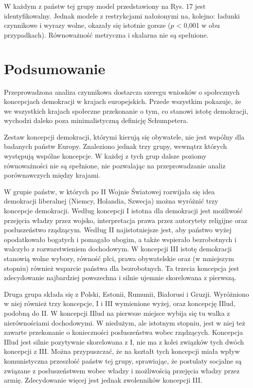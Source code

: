 \documentclass[12pt]{article}
\begin{document}
W każdym z państw tej grupy model przedstawiony na Rys. 17 jest identyfikowalny. Jednak modele z restrykcjami nałożonymi na, kolejno: ładunki czynnikowe i wyrazy wolne, okazały się istotnie gorsze (\(p\) \textless{} 0,001 w obu przypadkach). Równoważność metryczna i skalarna nie są spełnione.

\hypertarget{podsumowanie}{%
\section{Podsumowanie}\label{podsumowanie}}

Przeprowadzona analiza czynnikowa dostarcza szeregu wniosków o społecznych koncepcjach demokracji w krajach europejskich. Przede wszystkim pokazuje, że we wszystkich krajach społeczne przekonanie o tym, co stanowi istotę demokracji, wychodzi daleko poza minimalistyczną definicję Schumpetera.

Zestaw koncepcji demokracji, którymi kierują się obywatele, nie jest wspólny dla badanych państw Europy. Znaleziono jednak trzy grupy, wewnątrz których występują wspólne koncepcje. W każdej z tych grup dalsze poziomy równoważności nie są spełnione, nie pozwalając na przeprowadzanie analiz porównawczych między krajami.

W grupie państw, w których po II Wojnie Światowej rozwijała się idea demokracji liberalnej (Niemcy, Holandia, Szwecja) można wyróżnić trzy koncepcje demokracji. Według koncepcji I istotna dla demokracji jest możliwość przejęcia władzy przez wojsko, interpretacja prawa przez autorytety religijne oraz posłuszeństwo rządzącym. Według II najistotniejsze jest, aby państwo wyżej opodatkowało bogatych i pomagało ubogim, a także wspierało bezrobotnych i walczyło z rozwarstwieniem dochodowym. W koncepcji III istotę demokracji stanowią wolne wybory, równość płci, prawa obywatelskie oraz (w mniejszym stopniu) również wsparcie państwa dla bezrobotnych. Ta trzecia koncepcja jest zdecydowanie najbardziej powszechna i silnie ujemnie skorelowana z pierwszą.

Druga grupa składa się z Polski, Estonii, Rumunii, Białorusi i Gruzji. Wyróżniono w niej również trzy koncepcje, I i III wymienione wyżej, oraz koncepcję IIlud, podobną do II. W koncepcji IIlud na pierwsze miejsce wybija się tu walka z nierównościami dochodowymi. W niedużym, ale istotnym stopniu, jest w niej też zawarte przekonanie o konieczności posłuszeństwa wobec rządzących. Koncepcja IIlud jest silnie pozytywnie skorelowana z I, nie ma z kolei związków tych dwóch koncepcji z III. Można przypuszczać, że na kształt tych koncepcji miała wpływ komunistyczna przeszłość państw tej grupy, sprawiając, że postulaty socjalne są związane z posłuszeństwem wobec władzy i możliwością przejęcia władzy przez armię. Zdecydowanie więcej jest jednak zwolenników koncepcji III.
\end{document}
